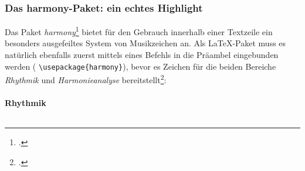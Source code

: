 %
%
%




\subsubsection{Das harmony-Paket: ein echtes Highlight}

Das Paket \emph{harmony}\footcite[vgl.][\nopage wp]{CtanHarmony2018a} bietet für
den Gebrauch innerhalb einer Textzeile ein besonders ausgefeiltes System von
Musikzeichen an. Als \LaTeX-Paket muss es natürlich ebenfalls zuerst mittels
eines Befehls in die Präambel eingebunden werden (\small 
\texttt{\textbackslash{usepackage\{harmony\}}}), bevor es Zeichen für die beiden
Bereiche \emph{Rhythmik} und \emph{Harmonieanalyse} bereitstellt\footcite[Für
einen vollen Überblick über den Zeichenvorrat und die Kombinationsmöglichkeiten
vgl.][4ff]{WegWeg2007a}:

\paragraph{\small Rhythmik}$\;$ \\


